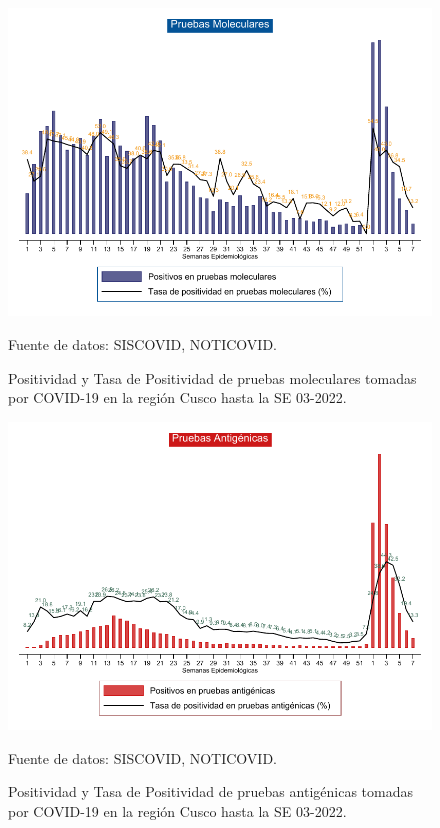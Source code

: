 \documentclass[12pt,a4paper,openany]{book}
\begin{document}
\begin{landscape}
	\begin{figure}[h]
		\caption{Positividad y Tasa de Positividad de pruebas moleculares tomadas por COVID-19 en la región Cusco hasta la SE 03-2022.}\label{fig:positividad_pcr}
		\begin{center}
			\includegraphics[width=0.90\linewidth]{../figuras/positividad_pcr.pdf}
		\end{center}
		{\footnotesize {Fuente de datos: SISCOVID, NOTICOVID.}}
	\end{figure}
\end{landscape}
\clearpage
\begin{landscape}

	\begin{figure}[h]
		\caption{ Positividad y Tasa de Positividad de pruebas antigénicas tomadas por COVID-19 en la región Cusco hasta la SE 03-2022.}\label{fig:positividad_ag}
		\begin{center}
			\includegraphics[width=0.90\linewidth]{../figuras/positividad_ag.pdf}
		\end{center}
		{\footnotesize {Fuente de datos: SISCOVID, NOTICOVID.}}
	\end{figure}
\end{landscape}
\clearpage
\end{document}
